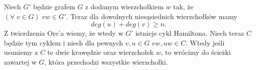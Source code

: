\documentclass{article}
\begin{document}
\medskip

Niech $G'$ będzie grafem $G$ z dodanym wierzchołkiem $w$ tak, że $(\forall\;v\in G)\;vw\in G'$. Teraz dla dowolnych niesąsiednich wierzchołków mamy
$$deg(u)+deg(v)\geq n.$$
Z twierdzenia Ore'a wiemy, że wtedy w $G'$ istnieje cykl Hamiltona. Niech teraz $C$ będzie tym cyklem i niech dla pewnych $v, u\in G$ $vw, uw\in C$. Wtedy jeśli usuniemy z $C$ te dwie krawędzie oraz wierzchołek $w$, to wrócimy do ścieżki zawartej w $G$, która przechodzi wszystkie wierzchołki.





\end{document}
